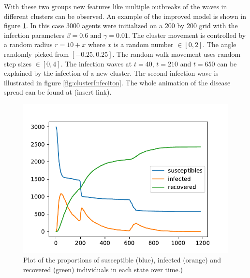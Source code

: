 With these two groups new features like multiple outbreaks of the waves in different clusters can be observed. An example of the improved model is shown in figure \ref{fig:multipleOutbreaks}. In this case 3000 agents were initialized on a 200 by 200 grid with the infection parameters $\beta=0.6$ and $\gamma = 0.01$. The cluster movement is controlled by a random radius $r=10+x$ where $x$ is a random number $\in [0,2]$. The angle randomly picked from $[-0.25,0.25]$. The random walk movement uses random step sizes $\in [0,4]$.  \newline
The infection waves at $t = 40$, $t = 210$ and $t= 650$ can be explained by the infection of a new cluster. The second infection wave is illustrated in figure \ref{fig:clusterInfeciton}. The whole animation of the disease spread can be found at (insert link). 

\begin{figure}[H]
	\centering
	\includegraphics[width=0.7\linewidth]{docs/img/multipleOutbreaks.pdf}
	\caption{Plot  of  the  proportions  of  susceptible  (blue),  infected  (orange)  and  recovered  (green)  individuals  in  each  state over time.)}%
	\label{fig:multipleOutbreaks}
\end{figure}

